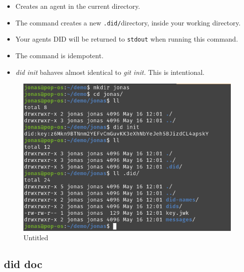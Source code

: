 \begin{itemize}
\tightlist
\item
  Creates an agent in the current directory.
\item
  The command creates a new \passthrough{\lstinline!.did/!}directory,
  inside your working directory.
\item
  Your agents DID will be returned to \passthrough{\lstinline!stdout!}
  when running this command.
\item
  The command is idempotent.
\item
  \emph{did init} bahaves almost identical to \emph{git init.} This is
  intentional.
\end{itemize}

\begin{figure}
\centering
\includegraphics{User Interface f8759a9462b24d5f95cf6123d68b89ea/Untitled 1.png}
\caption{Untitled}
\end{figure}

\hypertarget{did-doc}{%
\subsection{did doc}\label{did-doc}}

